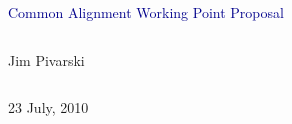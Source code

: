 \documentclass[compress]{beamer}
\begin{document}
\begin{frame}
\vfill
\begin{center}
\textcolor{darkblue}{\Large Common Alignment Working Point Proposal}

\vfill
\begin{columns}
\begin{center}
\large
Jim Pivarski
\end{center}
\end{columns}

\vfill
23 July, 2010

\end{center}
\end{frame}


\small
\end{document}
